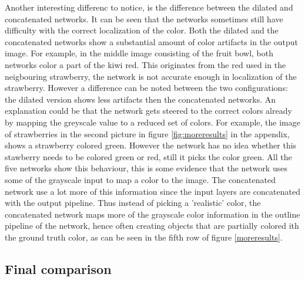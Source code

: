 Another interesting differenc to notice, is the difference between the dilated and concatenated networks. It can be seen that the networks sometimes still have difficulty with the correct localization of the color. Both the dilated and the concatenated networks show a substantial amount of color artifacts in the output image. For example, in the middle image consisting of the fruit bowl, both networks color a part of the kiwi red. This originates from the red used in the neigbouring strawberry, the network is not accurate enough in localization of the strawberry. However a difference can be noted between the two configurations: the dilated version shows less artifacts then the concatenated networks. An explanation could be that the network gets steered to the correct colors already by mapping the greyscale value to a reduced set of colors. For example, the image of strawberries in the second picture in figure \ref{fig:moreresults} in the appendix, shows a strawberry colored green. However the network has no idea whether this stawberry needs to be colored green or red, still it picks the color green. All the five networks show this behaviour, this is some evidence that the network uses some of the grayscale input to map a color to the image. The concatenated network use a lot more of this information since the input layers are concatenated with the output pipeline. Thus instead of picking a 'realistic' color, the concatenated network maps more of the grayscale color information in the outline pipeline of the network, hence often creating objects that are partially colored ith the ground truth color, as can be seen in the fifth row of figure \ref{moreresults}.
\subsection{Final comparison}








